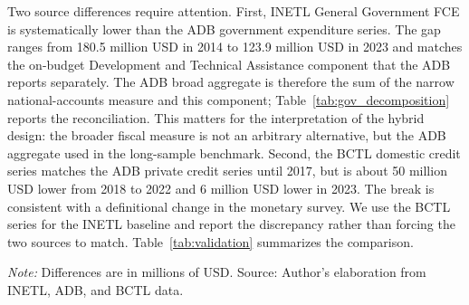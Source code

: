 \documentclass[11pt,a4paper]{article}
\begin{document}
Two source differences require attention. First, INETL General Government FCE is systematically lower than the ADB government expenditure series. The gap ranges from 180.5 million USD in 2014 to 123.9 million USD in 2023 and matches the on-budget Development and Technical Assistance component that the ADB reports separately. The ADB broad aggregate is therefore the sum of the narrow national-accounts measure and this component; Table~\ref{tab:gov_decomposition} reports the reconciliation. This matters for the interpretation of the hybrid design: the broader fiscal measure is not an arbitrary alternative, but the ADB aggregate used in the long-sample benchmark. Second, the BCTL domestic credit series matches the ADB private credit series until 2017, but is about 50 million USD lower from 2018 to 2022 and 6 million USD lower in 2023. The break is consistent with a definitional change in the monetary survey. We use the BCTL series for the INETL baseline and report the discrepancy rather than forcing the two sources to match. Table~\ref{tab:validation} summarizes the comparison.

\begin{table}[htbp]
\centering
\small
\caption{Comparison of INETL quarterly and annual ADB series, 2014--2023}
\label{tab:validation}
\par\vspace{0.3em}
\begin{minipage}{0.95\textwidth}
\footnotesize\textit{Note:} Differences are in millions of USD. Source: Author's elaboration from INETL, ADB, and BCTL data.
\end{minipage}
\end{table}
\end{document}
